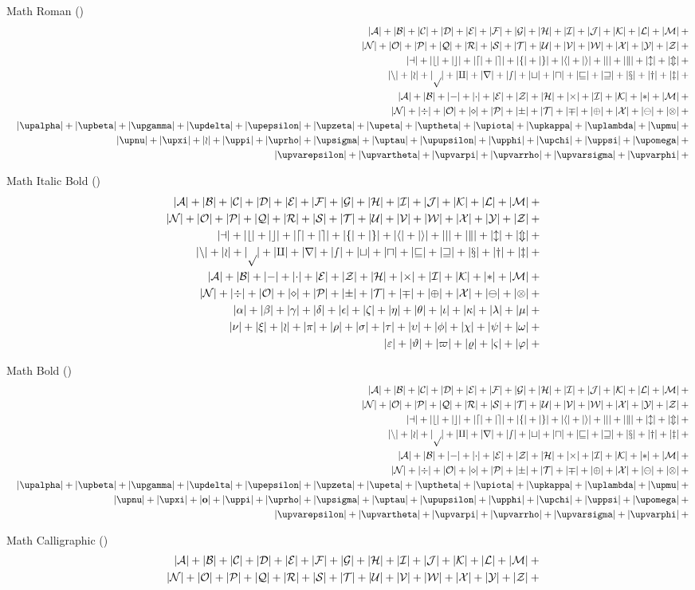 \documentclass[11pt, a4paper, oneside]{article}
\theoremstyle{Plain}
\theoremstyle{Definition}
\theoremstyle{Remark}
\begin{document}
\begin{appendix}
	Math Roman (\texttt{\string\mathrm})
	\def\test#1{|\mathrm{#1}|+{}}%
	\begin{eqnarray*}
	  && {\testupperi}\\
	  && {\testupperii}\\
	  && {\testloweri}\\
	  && {\testlowerii}\\
	  && {\testupgreeki}\\
	  && {\testupgreekii}\\
	  && {\testlowgreekupi}\\
	  && {\testlowgreekupii}\\
	  && {\testlowgreekupiii}
	\end{eqnarray*}%

	Math Italic Bold (\texttt{\string\bm})
	\def\test#1{|\bm{#1}|+{}}%
	\begin{eqnarray*}
	  && {\testupperi}\\
	  && {\testupperii}\\
	  && {\testloweri}\\
	  && {\testlowerii}\\
	  && {\testupgreeki}\\
	  && {\testupgreekii}\\
	  && {\testlowgreeki}\\
	  && {\testlowgreekii}\\
	  && {\testlowgreekiii}
	\end{eqnarray*}%

	Math Bold (\texttt{\string\mathbf})
	\def\test#1{|\mathbf{#1}|+{}}%
	\begin{eqnarray*}
	  && {\testupperi}\\
	  && {\testupperii}\\
	  && {\testloweri}\\
	  && {\testlowerii}\\
	  && {\testupgreeki}\\
	  && {\testupgreekii}\\
	  && {\def\test#1{|\bm{\mathbf{#1}}|+{}}\testlowgreekupi}\\
	  && {\def\test#1{|\bm{\mathbf{#1}}|+{}}\testlowgreekupii}\\
	  && {\def\test#1{|\bm{\mathbf{#1}}|+{}}\testlowgreekupiii}
	\end{eqnarray*}%

	Math Calligraphic (\texttt{\string\mathcal})
	\def\test#1{|\mathcal{#1}|+{}}%
	\begin{eqnarray*}
	  && {\testupperi}\\
	  && {\testupperii}
	\end{eqnarray*}%


\end{appendix}
\end{document}
